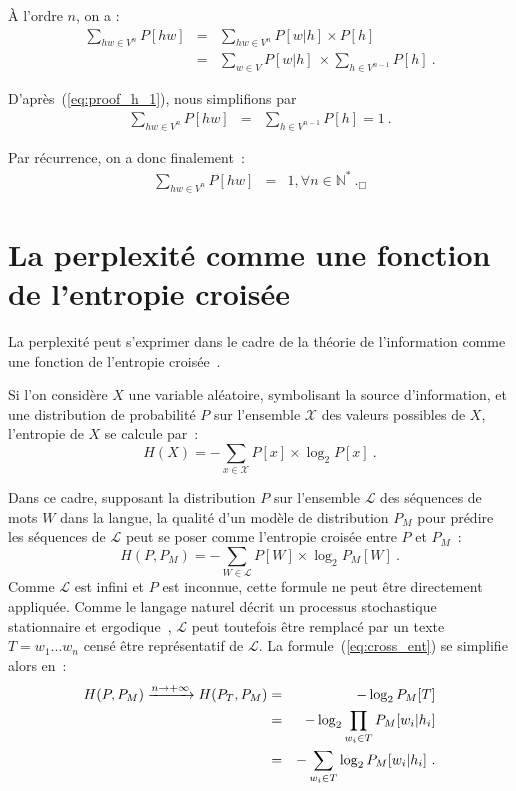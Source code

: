 À l'ordre $n$, on a :
\begin{eqnarray}
\sum_{hw \in V^n} P[hw]  &=& \sum_{hw \in V^n}
P[w|h] \times P[h]\\
 & = & \sum_{w \in V} P[w|h] ~\times \sum_{h \in V^{n-1}} P[h]~.
\end{eqnarray}

D'après~(\ref{eq:proof_h_1}), nous simplifions par
\begin{eqnarray}
\sum_{hw \in V^n} P[hw] & = & \sum_{h \in V^{n-1}} P[h] = 1~.
\end{eqnarray}

Par récurrence, on a donc finalement~:
\begin{eqnarray}
\sum_{hw \in V^n} P[hw] & = & 1, \forall n \in \mathbb{N}^*~._\Box
\end{eqnarray}

\section{La perplexité comme une fonction de l'entropie croisée}
\label{sec:ppl_ent}

La perplexité peut s'exprimer dans le cadre de la théorie de
l'information comme une fonction de l'entropie croisée~\cite{Cover1991}.

Si l'on considère $X$ une variable aléatoire, symbolisant la source
d'information, et une distribution de probabilité $P$ sur l'ensemble
$\mathcal{X}$ des valeurs possibles de $X$, l'entropie de $X$ se calcule par~:
\begin{equation}
 H(X) = - \sum_{x \in \mathcal{X}} P[x] \times \log_2 P[x]~.
\end{equation}

Dans ce cadre, supposant la distribution $P$ sur l'ensemble $\mathcal{L}$
des séquences de mots $W$ dans la langue, la qualité d'un modèle de distribution
$P_M$ pour prédire les séquences de $\mathcal{L}$ peut se poser comme l'entropie
croisée entre $P$ et $P_M$~:
\begin{equation}
 H(P,P_M) = - \sum_{W \in \mathcal{L}} P[W] \times \log_2 P_M[W]~.
\label{eq:cross_ent}
\end{equation}
Comme $\mathcal{L}$ est infini et $P$ est inconnue, cette formule
ne peut être directement appliquée. Comme le langage
naturel décrit un processus stochastique stationnaire et
ergodique~\cite{Cover1991}, $\mathcal{L}$ peut toutefois être remplacé
par un texte $T=w_1...w_n$ censé être représentatif de
$\mathcal{L}$. La formule~(\ref{eq:cross_ent}) se simplifie alors en~:
\begin{eqnarray}
H(P,P_M) \xrightarrow{n\rightarrow+\infty} H(P_T,P_M) &=& - \log_2
P_M[T]\notag\\
            &=& - \log_2 \prod_{w_i \in T} P_M[w_i|h_i]\notag\\
            &=& - \sum_{w_i \in T} \log_2 P_M[w_i|h_i]~.
\label{eq:cross_ent_pt}
\end{eqnarray}

